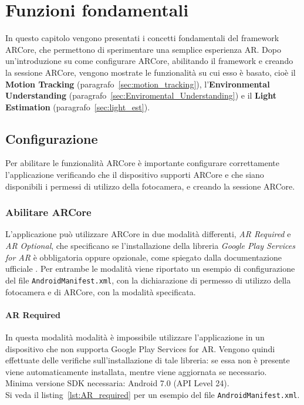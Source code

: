 \documentclass[crop=false, class=book]{standalone}
\begin{document}
	\chapter{Funzioni fondamentali}
	
	In questo capitolo vengono presentati i concetti fondamentali del framework ARCore, che permettono di sperimentare una semplice esperienza AR. Dopo un'introduzione su come configurare ARCore, abilitando il framework e creando la sessione ARCore, vengono mostrate le funzionalità su cui esso è basato, cioè il \textbf{Motion Tracking} (paragrafo~\vref{sec:motion_tracking}), l'\textbf{Environmental Understanding} (paragrafo~\vref{sec:Enviromental_Understanding}) e il \textbf{Light Estimation} (paragrafo~\vref{sec:light_est}).
	
	\section{Configurazione}
	Per abilitare le funzionalità ARCore è importante configurare correttamente l'applicazione verificando che il dispositivo supporti ARCore e che siano disponibili i permessi di utilizzo della fotocamera, e creando la sessione ARCore.
	
	\subsection{Abilitare ARCore}
	L'applicazione può utilizzare ARCore in due modalità differenti, \textit{AR Required} e \textit{AR Optional}, che specificano se l'installazione della libreria \textit{Google Play Services for AR} è obbligatoria oppure opzionale, come spiegato dalla documentazione ufficiale \cite{google2022enable}. Per entrambe le modalità viene riportato un esempio di configurazione del file \verb|AndroidManifest.xml|, con la dichiarazione di permesso di utilizzo della fotocamera e di ARCore, con la modalità specificata.
	
	\subsubsection{AR Required} 
	In questa modalità modalità è impossibile utilizzare l'applicazione in un dispositivo che non supporta Google Play Services for AR. Vengono quindi effettuate delle verifiche sull'installazione di tale libreria: se essa non è presente viene automaticamente installata, mentre viene aggiornata se necessario. 
	\\
	Minima versione SDK necessaria: Android 7.0 (API Level 24). 
	\\
	Si veda il listing~\vref{lst:AR_required} per un esempio del file \verb|AndroidManifest.xml|.
	
\end{document}
